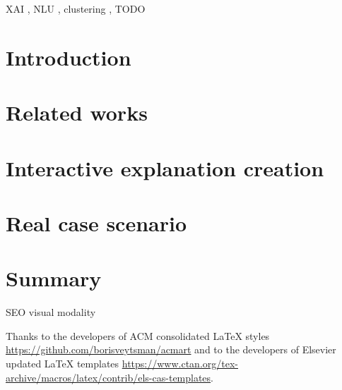 \documentclass[
]{ceurart}
\begin{document}
\begin{keywords}
  XAI \sep
  NLU \sep
  clustering \sep
  TODO
\end{keywords}

\maketitle

\section{Introduction}


\section{Related works}

\section{Interactive explanation creation}

\section{Real case scenario}


\section{Summary}
SEO
visual modality

\begin{acknowledgments}
  Thanks to the developers of ACM consolidated LaTeX styles
  \url{https://github.com/borisveytsman/acmart} and to the developers
  of Elsevier updated \LaTeX{} templates
  \url{https://www.ctan.org/tex-archive/macros/latex/contrib/els-cas-templates}.  
\end{acknowledgments}


\end{document}
